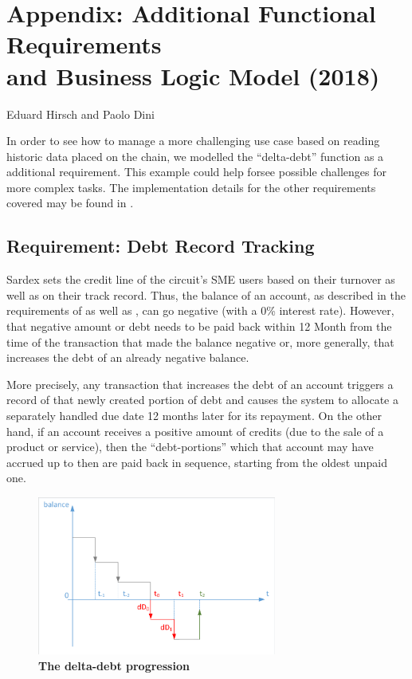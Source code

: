 \chapter*{Appendix: Additional Functional Requirements\\ and Business Logic Model (2018)}
\label{appendix}

\vspace{-1cm}
\begin{center}
Eduard Hirsch and Paolo Dini
\end{center}

In order to see how to manage a more challenging use case based on reading historic data placed on the chain, we modelled the ``delta-debt'' function as a additional requirement. This example could help forsee possible challenges for more complex tasks. The implementation details for the other requirements covered may be found in \cite{INTERLACE_D32}.

\section{Requirement: Debt Record Tracking}

Sardex sets the credit line of the circuit's SME users based on their turnover as well as on their track record. Thus, the balance of an account, as described in the requirements of \cite{INTERLACE_D21} as well as \cite{INTERLACE_D31}, can go negative (with a 0\% interest rate). However, that negative amount or debt needs to be paid back within 12 Month from the time of the transaction that made the balance negative or, more generally, that increases the debt of an already negative balance.

More precisely, any transaction that increases the debt of an account triggers a record of that newly created portion of debt and causes the system to allocate a separately handled due date 12 months later for its repayment. On the other hand, if an account receives a positive amount of credits (due to the sale of a product or service), then the ``debt-portions'' which that account may have accrued up to then are paid back in sequence, starting from the oldest unpaid one.

\renewcommand{\thefigure}{A.\arabic{figure}}
\setcounter{figure}{0}

\begin{figure}[htbp]
  \centering
  \includegraphics[width=0.7\textwidth, clip, trim=1mm 1mm 1mm 1mm]{Figures/deltadebt}
  \caption{\bf\small The delta-debt progression}
  \label{fig:debt-graph}
\end{figure}

